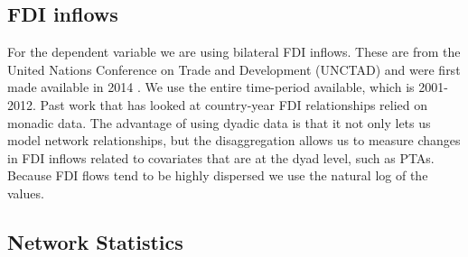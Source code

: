 \documentclass{article}
\begin{document}
\subsection{FDI inflows}

For the dependent variable we are using bilateral FDI inflows. These are from the United Nations Conference on Trade and Development (UNCTAD) and were first made available in 2014 \citep{UNCTAD}. We use the entire time-period available, which is 2001-2012. Past work that has looked at country-year FDI relationships relied on monadic data. The advantage of using dyadic data is that it not only lets us model network relationships, but the disaggregation allows us to measure changes in FDI inflows related to covariates that are at the dyad level, such as PTAs. Because FDI flows tend to be highly dispersed we use the natural log of the values. 

\subsection{Network Statistics}
\end{document}

